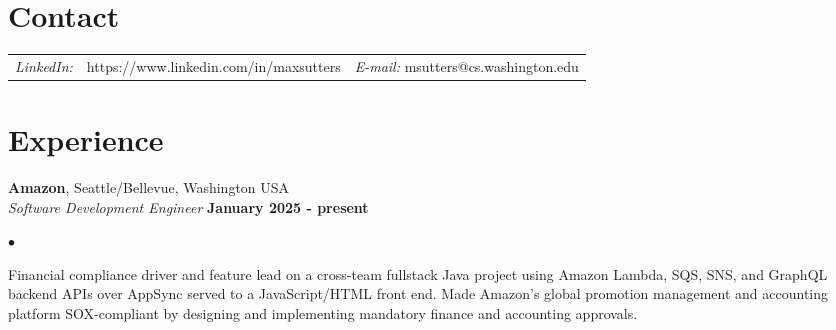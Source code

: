 \documentclass[margin,line]{res}
\newenvironment{list2}{
  \begin{list}{$\bullet$}{%
      \setlength{\itemsep}{0in}
      \setlength{\parsep}{0in} \setlength{\parskip}{0in}
      \setlength{\topsep}{0in} \setlength{\partopsep}{0in} 
      \setlength{\leftmargin}{0.2in}}}{\end{list}}
\begin{document}
\thispagestyle{empty}


\begin{resume}
\section{\sc Contact} %
\vspace{.05in}
\begin{tabular}{@{}p{0.5in}p{2.5in}p{3in}}
{\it LinkedIn:} & https://www.linkedin.com/in/maxsutters & {\it E-mail:}  msutters@cs.washington.edu \\   
\end{tabular}

\section{\sc Experience}

{\bf Amazon}, Seattle/Bellevue, Washington USA \\
{\em Software Development Engineer} \hfill {\bf January 2025 - present} \\

\begin{list2}
\item Financial compliance driver and feature lead on a cross-team fullstack Java project using Amazon Lambda, SQS, SNS, and GraphQL backend APIs over AppSync served to a JavaScript/HTML front end. Made Amazon's global promotion management and accounting platform SOX-compliant by designing and implementing mandatory finance and accounting approvals.
\end{list2}


\end{resume}
\end{document}
